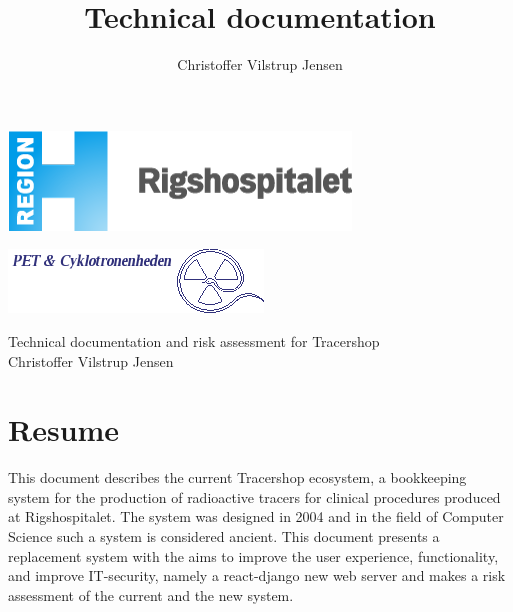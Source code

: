 \documentclass{article}
\author{Christoffer Vilstrup Jensen}
\title{Technical documentation}
\begin{document}
\begin{titlepage}
  \begin{minipage}{0.48\linewidth}
    \includegraphics[width=0.6\linewidth]{logo.png}
  \end{minipage}
  \begin{minipage}{0.48\linewidth}
    \raggedleft
      \includegraphics[width=0.6\linewidth]{petlogo_small.png}
  \end{minipage}
  \vspace{1cm}
  \begin{center}
    \Huge Technical documentation and risk assessment for Tracershop \\
    \vspace{1cm}
    \Large Christoffer Vilstrup Jensen\\
  \end{center}
\end{titlepage}

\section*{Resume}
This document describes the current Tracershop ecosystem,
a bookkeeping system for the production of radioactive tracers for clinical procedures produced at Rigshospitalet.
The system was designed in 2004 and in the field of Computer Science such a system is considered ancient.
This document presents a replacement system with the aims to improve the user experience, functionality, and improve IT-security, namely
 a react-django new web server and makes a risk assessment of the current and the new system.
\end{document}

